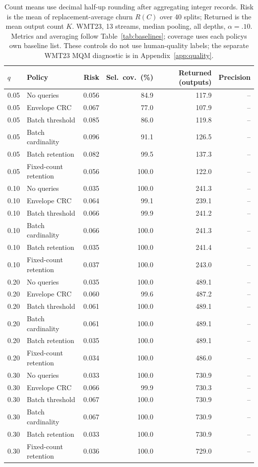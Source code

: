 \begin{table}[t]
\centering\small
\begin{tabular}{llrrrr}
\toprule
$q$ & Policy & Risk & Sel.\ cov.\ (\%) & Returned (outputs) & Precision \\
\midrule
0.05 & No queries & 0.056 & 84.9 & 117.9 & -- \\
0.05 & Envelope CRC & 0.067 & 77.0 & 107.9 & -- \\
0.05 & Batch threshold & 0.085 & 86.0 & 119.8 & -- \\
0.05 & Batch cardinality & 0.096 & 91.1 & 126.5 & -- \\
0.05 & Batch retention & 0.082 & 99.5 & 137.3 & -- \\
0.05 & Fixed-count retention & 0.056 & 100.0 & 122.0 & -- \\
0.10 & No queries & 0.035 & 100.0 & 241.3 & -- \\
0.10 & Envelope CRC & 0.064 & 99.1 & 239.1 & -- \\
0.10 & Batch threshold & 0.066 & 99.9 & 241.2 & -- \\
0.10 & Batch cardinality & 0.066 & 100.0 & 241.3 & -- \\
0.10 & Batch retention & 0.035 & 100.0 & 241.4 & -- \\
0.10 & Fixed-count retention & 0.037 & 100.0 & 243.0 & -- \\
0.20 & No queries & 0.035 & 100.0 & 489.1 & -- \\
0.20 & Envelope CRC & 0.060 & 99.6 & 487.2 & -- \\
0.20 & Batch threshold & 0.061 & 100.0 & 489.1 & -- \\
0.20 & Batch cardinality & 0.061 & 100.0 & 489.1 & -- \\
0.20 & Batch retention & 0.035 & 100.0 & 489.1 & -- \\
0.20 & Fixed-count retention & 0.034 & 100.0 & 486.0 & -- \\
0.30 & No queries & 0.033 & 100.0 & 730.9 & -- \\
0.30 & Envelope CRC & 0.066 & 99.9 & 730.3 & -- \\
0.30 & Batch threshold & 0.067 & 100.0 & 730.9 & -- \\
0.30 & Batch cardinality & 0.067 & 100.0 & 730.9 & -- \\
0.30 & Batch retention & 0.033 & 100.0 & 730.9 & -- \\
0.30 & Fixed-count retention & 0.036 & 100.0 & 729.0 & -- \\
\bottomrule
\end{tabular}
\caption{Count means use decimal half-up rounding after aggregating integer records. Risk is the mean of replacement-average churn $R(C)$ over 40 splits; Returned is the mean output count $K$. WMT23, 13 streams, median pooling, all depths, $\alpha=.10$. Metrics and averaging follow Table~\ref{tab:baselines}; coverage uses each policy\textquotesingle s own baseline list. These controls do not use human-quality labels; the separate WMT23 MQM diagnostic is in Appendix~\ref{app:quality}.}
\label{tab:baseline-1-median}
\end{table}
